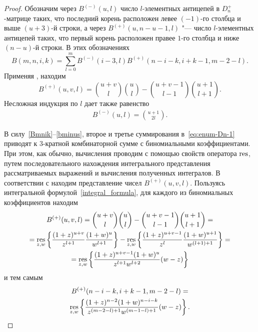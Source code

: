 \documentclass[a4paper,14pt,oneside,openany]{memoir}
\begin{document}
\begin{proof}
    Обозначим через $B^{(-)}(u,l)$ число $l$-элементных антицепей в $D_n^+$-матрице
    таких, что последний корень расположен левее $(-1)$-го столбца и выше $(u+3)$-й
    строки, а через $B^{(+)}(u,n-u-1,l)$ "--- число $l$-элементных антицепей таких,
    что первый корень расположен правее $1$-го столбца и ниже $(n-u)$-й строки. В
    этих обозначениях
    \begin{equation}\label{Bmnik}
        B(m,n,i,k)= \sum_{l=0}^m B^{(-)}(i-3,l)
        B^{(+)}(n-i-k,i+k-1,m-2-l).
    \end{equation}
    Применяя \cite[теорема~10.14.1]{Krattenthaler2015}, находим
    \begin{equation}
        B^{(+)}(u,v,l) =
        \binom{u+v}{l}\binom{u}{l} - \binom{u+v-1}{l-1}\binom{u+1}{l+1}.
    \end{equation}
    Несложная индукция по $l$ дает также равенство
    \begin{eqnarray}\label{bminus}
        B^{(-)}(u,l) = \binom{u+1}{2l}.
    \end{eqnarray}

    В силу~\eqref{Bmnik}--\eqref{bminus}, второе и третье суммирования
    в~\eqref{eq:enum-Dn-1} приводят к 3-кратной комбинаторной сумме с биномиальными
    коэффициентами. При этом, как обычно, вычисления проводим с помощью свойств
    оператора $\operatorname*{res}$, путем последовательного нахождения интегрального
    представления рассматриваемых выражений и вычисления полученных интегралов. В
    соответствии с \cite[теорема~10.14.1]{Krattenthaler2015} находим представление
    чисел $B^{(+)}(u,v,l)$. Пользуясь интегральной
    формулой~\eqref{integral_formula}, для каждого из биномиальных коэффициентов
    находим
    \begin{gather*}
        B^{(+)}(u,v,l) =
        \binom{u+v}{l}\binom{u}{l} - \binom{u+v-1}{l-1}\binom{u+1}{l+1} = \\
        = \operatorname*{res}_{z,w}\left\{ \frac{(1+z)^{u+v}}{z^{l+1}}\frac{(1+w)^u}{w^{l+1}}
        \right\}
        - \operatorname*{res}_{z,w}\left\{ \frac{(1+z)^{u+v-1}}{z^l}\frac{(1+w)^{u+1}}{w^{(l+1)+1}}
        \right\} = \\
        = \operatorname*{res}_{z,w}\left\{ \frac{(1+z)^{u+v-1}(1+w)^u}{z^{l+1}w^{l+2}}(w-z) \right\}
    \end{gather*}
    и тем самым
    \begin{equation*}
        \begin{gathered}
            B^{(+)}(n-i-k, i+k-1, m - 2 - l) = \\
            \operatorname*{res}_{z,w}\left\{ \frac{(1+z)^{n-2}(1+w)^{n-i-k}}{z^{(m-2-l) +
                    1}w^{(m-1-l)
                    + 1}}(w-z) \right\}.
        \end{gathered}
    \end{equation*}


\end{proof}
\end{document}
